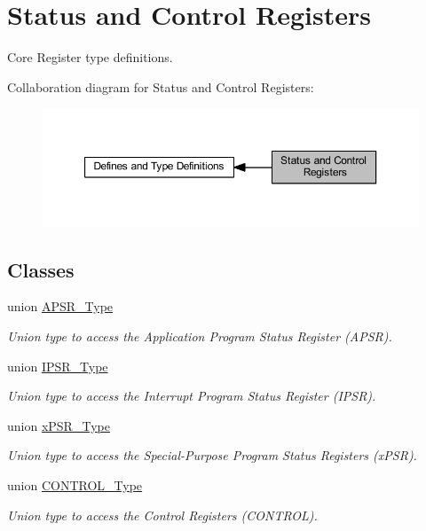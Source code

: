 \hypertarget{group___c_m_s_i_s___c_o_r_e}{}\section{Status and Control Registers}
\label{group___c_m_s_i_s___c_o_r_e}


Core Register type definitions.  


Collaboration diagram for Status and Control Registers\+:
\nopagebreak
\begin{figure}[H]
\begin{center}
\leavevmode
\includegraphics[width=350pt]{group___c_m_s_i_s___c_o_r_e}
\end{center}
\end{figure}
\subsection*{Classes}
\begin{DoxyCompactItemize}
\item 
union \hyperlink{union_a_p_s_r___type}{A\+P\+S\+R\+\_\+\+Type}
\begin{DoxyCompactList}\small\item\em Union type to access the Application Program Status Register (A\+P\+SR). \end{DoxyCompactList}\item 
union \hyperlink{union_i_p_s_r___type}{I\+P\+S\+R\+\_\+\+Type}
\begin{DoxyCompactList}\small\item\em Union type to access the Interrupt Program Status Register (I\+P\+SR). \end{DoxyCompactList}\item 
union \hyperlink{unionx_p_s_r___type}{x\+P\+S\+R\+\_\+\+Type}
\begin{DoxyCompactList}\small\item\em Union type to access the Special-\/\+Purpose Program Status Registers (x\+P\+SR). \end{DoxyCompactList}\item 
union \hyperlink{union_c_o_n_t_r_o_l___type}{C\+O\+N\+T\+R\+O\+L\+\_\+\+Type}
\begin{DoxyCompactList}\small\item\em Union type to access the Control Registers (C\+O\+N\+T\+R\+OL). \end{DoxyCompactList}\end{DoxyCompactItemize}
